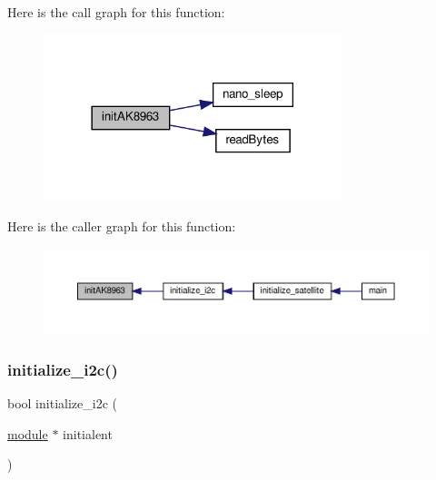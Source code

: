 Here is the call graph for this function\+:
\nopagebreak
\begin{figure}[H]
\begin{center}
\leavevmode
\includegraphics[width=246pt]{i2c-interface_8c_a70fbb9dd53a39541d7f04140a2c63f3f_cgraph}
\end{center}
\end{figure}
Here is the caller graph for this function\+:
\nopagebreak
\begin{figure}[H]
\begin{center}
\leavevmode
\includegraphics[width=350pt]{i2c-interface_8c_a70fbb9dd53a39541d7f04140a2c63f3f_icgraph}
\end{center}
\end{figure}
\mbox{\label{i2c-interface_8c_a8eb11c031b9484a01fd8b263c13373cf}} 
\subsubsection{\texorpdfstring{initialize\+\_\+i2c()}{initialize\_i2c()}}
{\footnotesize\ttfamily bool initialize\+\_\+i2c (\begin{DoxyParamCaption}\item[{\hyperlink{structmodule}{module} $\ast$}]{initialent }\end{DoxyParamCaption})}


